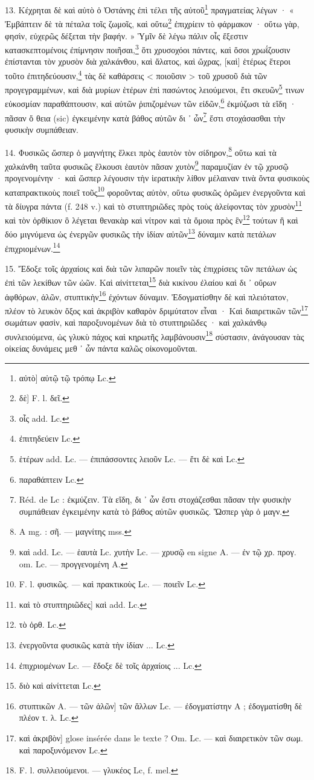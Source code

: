 \documentclass[a4paper, 11pt, oneside, polutonikogreek, french]{article}
\begin{document}
13. Κέχρηται δὲ καὶ αὐτὸ ὁ Ὀστάνης ἐπὶ τέλει τῆς αὐτοῦ\footnote{αὐτὸ] αὐτῷ τῷ τρόπῳ Lc.} πραγματείας λέγων · « Ἐμβάπτειν δὲ τὰ πέταλα τοῖς ζωμοῖς, καὶ οὕτω\footnote{δὲ] F. l. δεῖ.} ἐπιχρίειν τὸ φάρμακον · οὕτω γὰρ, φησὶν, εὐχερῶς δέξεται τὴν βαφήν. » Ὑμῖν δὲ λέγω πάλιν οἷς ἔξεστιν κατασκεπτομένοις ἐπίμνησιν ποιῆσαι,\footnote{οἷς add. Lc.} ὅτι χρυσοχόοι πάντες, καὶ ὅσοι χρωΐζουσιν ἐπίστανται τὸν χρυσὸν διὰ χαλκάνθου, καὶ ἅλατος, καὶ ὤχρας, [καὶ] ἑτέρως ἕτεροι τοῦτο ἐπιτηδεύουσιν,\footnote{ἐπιτηδεύειν Lc.} τὰς δὲ καθάρσεις < ποιοῦσιν > τοῦ χρυσοῦ διὰ τῶν προγεγραμμένων, καὶ διὰ μυρίων ἑτέρων ἐπὶ πασώντος λειούμενοι, ἔτι σκευῶν\footnote{ἑτέρων add. Lc. --- ἐπιπάσσοντες λειοῦν Lc. --- ἔτι δὲ καὶ Lc.} τινων εὐκοσμίαν παραθάπτουσιν, καὶ αὐτῶν ῥιπιζομένων τῶν εἰδῶν,\footnote{παραθάπτειν Lc.} ἐκμύζωσι τὰ εἴδη · πᾶσαν ὅ θεια (sic) ἐγκειμένην κατὰ βάθος αὐτῶν δι ᾽ ὧν\footnote{Réd. de Lc : ἐκμύζειν. Τὰ εἴδη, δι ᾽ ὧν ἔστι στοχάζεσθαι πᾶσαν τὴν φυσικὴν συμπάθειαν ἐγκειμένην κατὰ τὸ βάθος αὐτῶν φυσικῶς. Ὥσπερ γὰρ ὁ μαγν.} ἔστι στοχάσασθαι τὴν φυσικὴν συμπάθειαν.

14. Φυσικῶς ὥσπερ ὁ μαγνήτης ἕλκει πρὸς ἑαυτὸν τὸν σίδηρον,\footnote{A mg. : σῆ. --- μαγνίτης mss.} οὕτω καὶ τὰ χαλκάνθη ταῦτα φυσικῶς ἕλκουσι ἑαυτὸν πᾶσαν χυτὸν\footnote{καὶ add. Lc. --- ἑαυτὰ Lc. χυτὴν Lc. --- χρυσῷ en signe A. --- ἐν τῷ χρ. προγ. om. Lc. --- προγγενομένη A.} παραμυζίαν ἐν τῷ χρυσῷ προγενομένην · καὶ ὥσπερ λέγουσιν τὴν ἱερατικὴν λίθον μέλαιναν τινὰ ὄντα φυσικοὺς καταπρακτικοὺς ποιεῖ τοῦς\footnote{F. l. φυσικῶς. --- καὶ πρακτικοὺς Lc. --- ποιεῖν Lc.} φοροῦντας αὐτὸν, οὕτω φυσικῶς ὁρῶμεν ἐνεργοῦντα καὶ τὰ δίυγρα πάντα (f. 248 v.) καὶ τὸ στυπτηριῶδες πρὸς τοὺς ἀλείφοντας τὸν χρυσὸν\footnote{καὶ τὸ στυπτηριῶδες] καὶ add. Lc.} καὶ τὸν ὀρθίκιον ὃ λέγεται θενακὰρ καὶ νίτρον καὶ τὰ ὅμοια πρὸς ἓν\footnote{τὸ ὀρθ. Lc.} τούτων ἢ καὶ δύο μιγνύμενα ὡς ἐνεργῶν φυσικῶς τὴν ἰδίαν αὐτῶν\footnote{ἐνεργοῦντα φυσικῶς κατὰ τὴν ἰδίαν ... Lc.} δύναμιν κατὰ πετάλων ἐπιχριομένων.\footnote{ἐπιχριομένων Lc. --- ἔδοξε δὲ τοῖς ἀρχαίοις ... Lc.}

15. Ἔδοξε τοῖς ἀρχαίοις καὶ διὰ τῶν λιπαρῶν ποιεῖν τὰς ἐπιχρίσεις τῶν πετάλων ὡς ἐπὶ τῶν λεκίθων τῶν ὠῶν. Καὶ αἰνίττεται\footnote{διὸ καὶ αἰνίττεται Lc.} διὰ κικίνου ἐλαίου καὶ δι ᾽ οὔρων ἀφθόρων, ἁλῶν, στυπτικὴν\footnote{στυπτικῶν A. --- τῶν ἁλῶν] τῶν ἄλλων Lc. --- ἐδογματίστην A ; ἐδογματίσθη δὲ πλέον τ. λ. Lc.} ἐχόντων δύναμιν. Ἐδογματίσθην δὲ καὶ πλειότατον, πλέον τὸ λευκὸν ὄξος καὶ ἀκριβὸν καθαρὸν δριμύτατον εἶναι · Καὶ διαιρετικῶν τῶν\footnote{καὶ ἀκριβὸν] glose insérée dans le texte ? Om. Lc. --- καὶ διαιρετικὸν τῶν σωμ. καὶ παροξυνόμενον Lc.} σωμάτων φασὶν, καὶ παροξυνομένων διὰ τὸ στυπτηριῶδες · καὶ χαλκάνθῳ συνλειούμενα, ὡς γλυκὺ πάχος καὶ κηρωτῆς λαμβάνουσιν\footnote{F. l. συλλειούμενοι. --- γλυκέος Lc, f. mel.} σύστασιν, ἀνάγουσαν τὰς οἰκείας δυνάμεις μεθ ᾽ ὧν πάντα καλῶς οἰκονομοῦνται.
\end{document}
